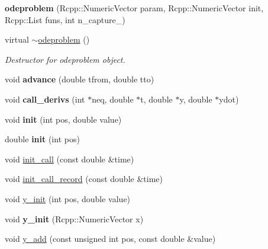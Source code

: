 \begin{DoxyCompactItemize}
\item 
\mbox{\label{classodeproblem_acc18c1c3dfc77ab1191daffdd4382f14}} 
{\bfseries odeproblem} (Rcpp\+::\+Numeric\+Vector param, Rcpp\+::\+Numeric\+Vector init, Rcpp\+::\+List funs, int n\+\_\+capture\+\_\+)
\item 
virtual \hyperlink{classodeproblem_a00c35020fc03286fd4596f25b3d82e34}{$\sim$odeproblem} ()
\begin{DoxyCompactList}\small\item\em Destructor for odeproblem object. \end{DoxyCompactList}\item 
\mbox{\label{classodeproblem_a0d35904cd64604463cba0065a3fc9c01}} 
void {\bfseries advance} (double tfrom, double tto)
\item 
\mbox{\label{classodeproblem_a3846fa84421ca3e2f84eceaf2958c519}} 
void {\bfseries call\+\_\+derivs} (int $\ast$neq, double $\ast$t, double $\ast$y, double $\ast$ydot)
\item 
\mbox{\label{classodeproblem_a2de806c10c0ce7e2a422b9d4210640f9}} 
void {\bfseries init} (int pos, double value)
\item 
\mbox{\label{classodeproblem_a1c53a46511e8c1739e4132073304c5e7}} 
double {\bfseries init} (int pos)
\item 
void \hyperlink{classodeproblem_a415e0001bfe1282764c339b6e8695ab8}{init\+\_\+call} (const double \&time)
\item 
void \hyperlink{classodeproblem_adc4a5dbcc9561903a7aa81a90e8a908b}{init\+\_\+call\+\_\+record} (const double \&time)
\item 
void \hyperlink{classodeproblem_a258d7fdca6eb1b49cac25cea9fcca9c4}{y\+\_\+init} (int pos, double value)
\item 
\mbox{\label{classodeproblem_a21fec9644d1f590e11fc80cd50ff5f5c}} 
void {\bfseries y\+\_\+init} (Rcpp\+::\+Numeric\+Vector x)
\item 
\mbox{\label{classodeproblem_aeb23afacc04444d129c91746e003240a}} 
void \hyperlink{classodeproblem_aeb23afacc04444d129c91746e003240a}{y\+\_\+add} (const unsigned int pos, const double \&value)

\end{DoxyCompactItemize}

